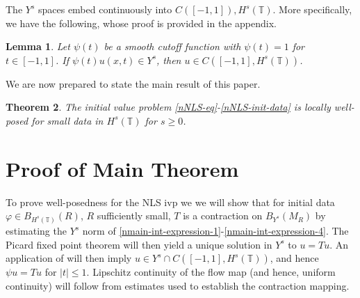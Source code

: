 \documentclass[12pt,reqno]{amsart}
\numberwithin{equation}{section}  %
\newcommand{\ci}{\mathbb{T}}
\newcommand{\vp}{\varphi}
\newtheorem{theorem}{Theorem}[section]
\newtheorem{lemma}[theorem]{Lemma}
\renewcommand{\cref}{\Cref}
\begin{document}
%
The $Y^s$ spaces embed continuously into $C([-1,1]), H^{s}(\ci)$. More
specifically, we have the following, whose proof
is provided in the appendix.
\begin{lemma}
	\label{nlem:cutoff-loc-soln}
	Let $\psi(t)$ be a smooth cutoff function with $\psi(t) =1$ for $t \in [-1,
  1]$. If
  $\psi(t)u(x,t) \in Y^s$, then $u \in C([-1, 1], H^s(\ci))$.
\end{lemma}

We are now prepared to state the main result of this paper.
%
%
%
%
%
%
%
%
%
%
\begin{theorem}
\label{nthm:main}
The initial value problem 
\eqref{nNLS-eq}-\eqref{nNLS-init-data} is locally well-posed for small data in $H^s(\ci)$ for $s \ge
0$.
%
\end{theorem} 
%
%
%
%
%
%
%
%
%
%
%
%
\section{Proof of Main Theorem}
%
%
To prove well-posedness for the NLS ivp we we will 
show that for initial data $\vp \in B_{H^{s}(\ci)}(R)$, $R$ sufficiently small,
$T$ is a contraction on
$B_{Y^{s}}(M_{R})$ by estimating the $Y^s$
norm of \eqref{nmain-int-expression-1}-\eqref{nmain-int-expression-4}. The 
Picard fixed point theorem will
then yield a unique solution in $Y^{s}$ to
$u = Tu$. An application of
\cref{nlem:cutoff-loc-soln} will then imply $u \in Y^{s} \cap C([-1, 1],
H^s(\ci))$, and hence 
$\psi u = Tu$ for $| t | \le 1$.
Lipschitz continuity of the flow map (and hence, uniform
continuity) will follow from estimates used to establish the contraction
mapping. 
%
%
%
%
%
%
%
%
%
\end{document}
